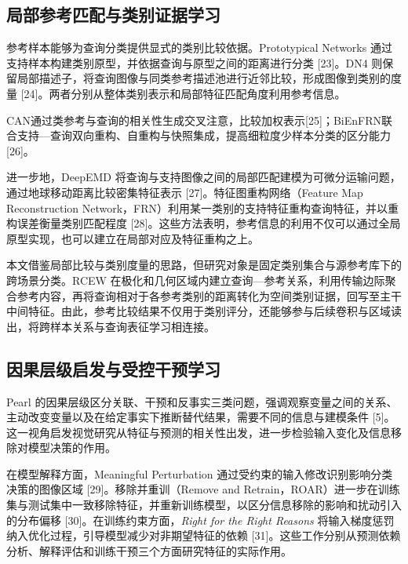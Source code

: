 \documentclass[journal,10pt,a4paper]{IEEEtran}
\begin{document}
\subsection{局部参考匹配与类别证据学习}\label{ux5c40ux90e8ux53c2ux8003ux5339ux914dux4e0eux7c7bux522bux8bc1ux636eux5b66ux4e60}

参考样本能够为查询分类提供显式的类别比较依据。Prototypical Networks 通过支持样本构建类别原型，并依据查询与原型之间的距离进行分类 {[}23{]}。DN4 则保留局部描述子，将查询图像与同类参考描述池进行近邻比较，形成图像到类别的度量 {[}24{]}。两者分别从整体类别表示和局部特征匹配角度利用参考信息。

CAN通过类参考与查询的相关性生成交叉注意，比较加权表示{[}25{]}；BiEnFRN联合支持---查询双向重构、自重构与快照集成，提高细粒度少样本分类的区分能力{[}26{]}。

进一步地，DeepEMD 将查询与支持图像之间的局部匹配建模为可微分运输问题，通过地球移动距离比较密集特征表示 {[}27{]}。特征图重构网络（Feature Map Reconstruction Network，FRN）利用某一类别的支持特征重构查询特征，并以重构误差衡量类别匹配程度 {[}28{]}。这些方法表明，参考信息的利用不仅可以通过全局原型实现，也可以建立在局部对应及特征重构之上。

本文借鉴局部比较与类别度量的思路，但研究对象是固定类别集合与源参考库下的跨场景分类。RCEW 在极化和几何区域内建立查询---参考关系，利用传输边际聚合参考内容，再将查询相对于各参考类别的距离转化为空间类别证据，回写至主干中间特征。由此，参考比较结果不仅用于类别评分，还能够参与后续卷积与区域读出，将跨样本关系与查询表征学习相连接。

\subsection{因果层级启发与受控干预学习}\label{ux56e0ux679cux5c42ux7ea7ux542fux53d1ux4e0eux53d7ux63a7ux5e72ux9884ux5b66ux4e60}

Pearl 的因果层级区分关联、干预和反事实三类问题，强调观察变量之间的关系、主动改变变量以及在给定事实下推断替代结果，需要不同的信息与建模条件 {[}5{]}。这一视角启发视觉研究从特征与预测的相关性出发，进一步检验输入变化及信息移除对模型决策的作用。

在模型解释方面，Meaningful Perturbation 通过受约束的输入修改识别影响分类决策的图像区域 {[}29{]}。移除并重训（Remove and Retrain，ROAR）进一步在训练集与测试集中一致移除特征，并重新训练模型，以区分信息移除的影响和扰动引入的分布偏移 {[}30{]}。在训练约束方面，\emph{Right for the Right Reasons} 将输入梯度惩罚纳入优化过程，引导模型减少对非期望特征的依赖 {[}31{]}。这些工作分别从预测依赖分析、解释评估和训练干预三个方面研究特征的实际作用。
\end{document}
